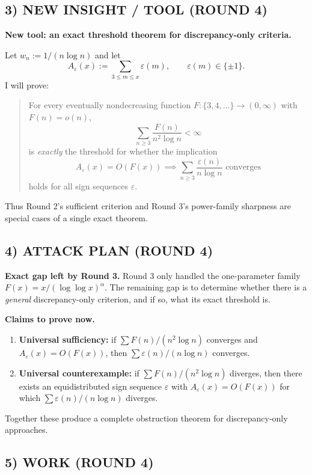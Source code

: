 \subsection{3) NEW INSIGHT / TOOL (ROUND 4)}

\textbf{New tool: an exact threshold theorem for discrepancy-only criteria.}

Let $w_n:=1/(n\log n)$ and let
\[
A_\varepsilon(x):=\sum_{3\le m\le x}\varepsilon(m), \qquad \varepsilon(m)\in\{\pm 1\}.
\]
I will prove:

\begin{quote}
For every eventually nondecreasing function $F:\{3,4,\dots\}\to (0,\infty)$ with $F(n)=o(n)$,
\[
\sum_{n\ge 3}\frac{F(n)}{n^2\log n}<\infty
\]
is \emph{exactly} the threshold for whether the implication
\[
A_\varepsilon(x)=O(F(x)) \implies \sum_{n\ge 3}\frac{\varepsilon(n)}{n\log n}\text{ converges}
\]
holds for all sign sequences $\varepsilon$.
\end{quote}

Thus Round 2's sufficient criterion and Round 3's power-family sharpness are special cases of a single exact theorem.

\subsection{4) ATTACK PLAN (ROUND 4)}

\textbf{Exact gap left by Round 3.}
Round 3 only handled the one-parameter family $F(x)=x/(\log\log x)^\alpha$.  The remaining gap is to determine whether there is a \emph{general} discrepancy-only criterion, and if so, what its exact threshold is.

\textbf{Claims to prove now.}
\begin{enumerate}
\item \textbf{Universal sufficiency:} if $\sum F(n)/(n^2\log n)$ converges and $A_\varepsilon(x)=O(F(x))$, then $\sum \varepsilon(n)/(n\log n)$ converges.
\item \textbf{Universal counterexample:} if $\sum F(n)/(n^2\log n)$ diverges, then there exists an equidistributed sign sequence $\varepsilon$ with $A_\varepsilon(x)=O(F(x))$ for which $\sum \varepsilon(n)/(n\log n)$ diverges.
\end{enumerate}

Together these produce a complete obstruction theorem for discrepancy-only approaches.

\subsection{5) WORK (ROUND 4)}

